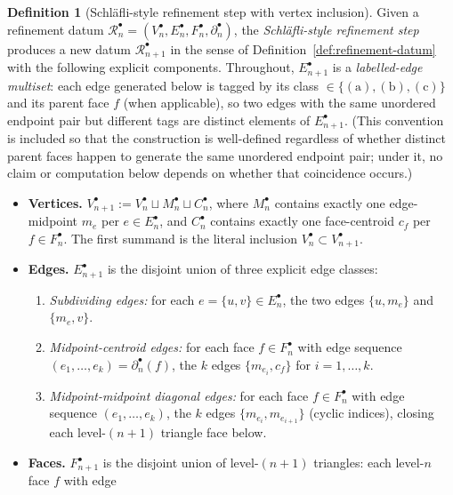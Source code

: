 \documentclass[11pt, a4paper]{amsart}
\theoremstyle{definition}
\newtheorem{definition}[theorem]{Definition}
\begin{document}
\begin{definition}[Schl\"{a}fli-style refinement step with vertex
inclusion]
\label{def:refinement}
Given a refinement datum
$\mathcal{R}_n^\bullet = (V_n^\bullet, E_n^\bullet, F_n^\bullet,
\partial_n^\bullet)$, the \emph{Schl\"{a}fli-style refinement step}
produces a new datum $\mathcal{R}_{n+1}^\bullet$ in the sense of
Definition~\ref{def:refinement-datum} with the following
explicit components. Throughout, $E_{n+1}^\bullet$ is a
\emph{labelled-edge multiset}: each edge generated below is
tagged by its class $\in \{(\mathrm{a}), (\mathrm{b}),
(\mathrm{c})\}$ and its parent face $f$ (when applicable), so
two edges with the same unordered endpoint pair but different
tags are distinct elements of $E_{n+1}^\bullet$. (This convention
is included so that the construction is well-defined regardless
of whether distinct parent faces happen to generate the same
unordered endpoint pair; under it, no claim or computation below
depends on whether that coincidence occurs.)
\begin{itemize}
\item \textbf{Vertices.}
  $V_{n+1}^\bullet := V_n^\bullet \sqcup M_n^\bullet \sqcup
  C_n^\bullet$, where $M_n^\bullet$ contains exactly one
  edge-midpoint $m_e$ per $e \in E_n^\bullet$, and $C_n^\bullet$
  contains exactly one face-centroid $c_f$ per $f \in F_n^\bullet$.
  The first summand is the literal inclusion
  $V_n^\bullet \subset V_{n+1}^\bullet$.
\item \textbf{Edges.} $E_{n+1}^\bullet$ is the disjoint union of
  three explicit edge classes:
  \begin{enumerate}[label=(\alph*), leftmargin=2.4em, nosep, topsep=1pt]
  \item \emph{Subdividing edges:} for each $e = \{u, v\} \in
    E_n^\bullet$, the two edges $\{u, m_e\}$ and $\{m_e, v\}$.
  \item \emph{Midpoint-centroid edges:} for each face
    $f \in F_n^\bullet$ with edge sequence
    $(e_1, \ldots, e_k) = \partial_n^\bullet(f)$, the $k$ edges
    $\{m_{e_i}, c_f\}$ for $i = 1, \ldots, k$.
  \item \emph{Midpoint-midpoint diagonal edges:} for each face
    $f \in F_n^\bullet$ with edge sequence $(e_1, \ldots, e_k)$,
    the $k$ edges $\{m_{e_i}, m_{e_{i+1}}\}$ (cyclic indices),
    closing each level-$(n+1)$ triangle face below.
  \end{enumerate}
\item \textbf{Faces.} $F_{n+1}^\bullet$ is the disjoint union of
  level-$(n+1)$ triangles: each level-$n$ face $f$ with edge

\end{itemize}
\end{definition}
\end{document}
